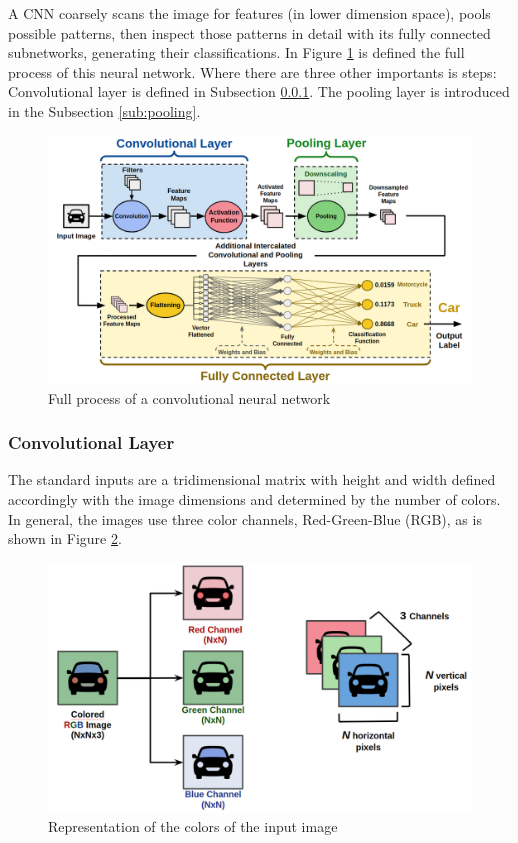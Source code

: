 A CNN coarsely scans the image for features (in lower dimension space), pools possible patterns, then inspect those patterns in detail with its fully connected
subnetworks, generating their classifications. In Figure \ref{fig:cnn_car} is defined the full process of this neural network. Where there are three other importants is steps: Convolutional layer is defined in Subsection \ref{sub:conv}. The pooling layer is introduced in the Subsection \ref{sub:pooling}.
\begin{figure}[H]
\centering
\includegraphics[width=\columnwidth]{imagens/Full_Process.png}
\caption{Full process of a convolutional neural network \cite{lecture}}
\label{fig:cnn_car}
\end{figure}


\subsubsection{Convolutional Layer}
\label{sub:conv}

The standard inputs are a tridimensional matrix with height and width defined accordingly with the image dimensions and determined by the number of colors. In general, the images use three color channels, Red-Green-Blue (RGB), as is shown in Figure \ref{fig:rgb}.

\begin{figure}[H]
\centering
\includegraphics[scale=0.35]{imagens/rgb_representation.png}
\caption{Representation of the colors of the input image \cite{lecture}}
\label{fig:rgb}
\end{figure}


